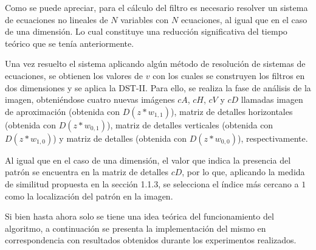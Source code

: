 \par Como se puede apreciar, para el c\'alculo del filtro es necesario resolver un sistema de ecuaciones no lineales de $N$ variables con $N$ ecuaciones, al igual que en el caso de una dimensi\'on. Lo cual constituye una reducci\'on significativa del tiempo te\'orico que se ten\'ia anteriormente.\\

\par Una vez resuelto el sistema aplicando alg\'un m\'etodo de resoluci\'on de sistemas de ecuaciones, se obtienen los valores de $v$ con los cuales se construyen los filtros en dos dimensiones y se aplica la DST-II. Para ello, se realiza la fase de an\'alisis de la imagen, obteni\'endose cuatro nuevas im\'agenes $cA$, $cH$, $cV$ y $cD$ llamadas imagen de aproximaci\'on (obtenida con $D(z\ast w_{1,1})$), matriz de detalles horizontales (obtenida con $D(z\ast w_{0,1})$), matriz de detalles verticales (obtenida con $D(z\ast w_{1,0})$) y matriz de detalles (obtenida con $D(z\ast w_{0,0})$), respectivamente.

\par Al igual que en el caso de una dimensi\'on, el valor que indica la presencia del patr\'on se encuentra en la matriz de detalles $cD$, por lo que, aplicando la medida de similitud propuesta en la secci\'on 1.1.3, se selecciona el \'indice m\'as cercano a $1$ como la localizaci\'on del patr\'on en la imagen.\\

\par Si bien hasta ahora solo se tiene una idea te\'orica del funcionamiento del algoritmo, a continuaci\'on se presenta la implementaci\'on del mismo en correspondencia con resultados obtenidos durante los experimentos realizados.